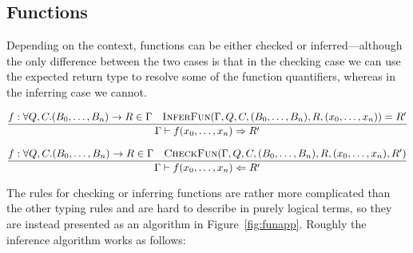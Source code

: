 \subsection{Functions}

Depending on the context, functions can be either checked or
inferred---although the only difference between the two cases is that
in the checking case we can use the expected return type to resolve
some of the function quantifiers, whereas in the inferring case we
cannot.

\begin{align*}
  \frac{
    f : \forall Q, C.(B_0,\ldots,B_n) \rightarrow R \in \Gamma
    \quad \textsc{InferFun}(\Gamma,Q,C,(B_0,\ldots,B_n),R,(x_0,\ldots,x_n)) = R'
  } {
    \Gamma \vdash f(x_0, \ldots, x_n) \Rightarrow R'
  }
\end{align*}

\begin{align*}
  \frac{
    f : \forall Q, C.(B_0,\ldots,B_n) \rightarrow R \in \Gamma
    \quad \textsc{CheckFun}(\Gamma,Q,C,(B_0,\ldots,B_n),R,(x_0,\ldots,x_n),R')
  } {
    \Gamma \vdash f(x_0, \ldots, x_n) \Leftarrow R'
  }
\end{align*}

The rules for checking or inferring functions are rather more
complicated than the other typing rules and are hard to describe in
purely logical terms, so they are instead presented as an algorithm in
Figure~\ref{fig:funapp}. Roughly the inference algorithm works as
follows:

